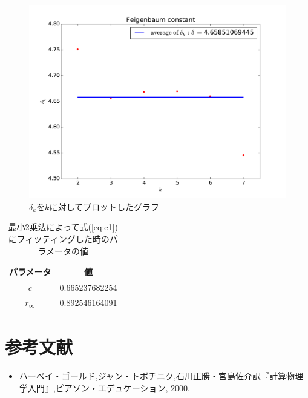 \documentclass{jsarticle}
\begin{document}
\begin{enumerate}
\begin{enumerate}
   \begin{figure}[H]
    \begin{center}
     \includegraphics[width=12.0cm]{figure_1.pdf}
     \caption{$\delta_{k}$を$k$に対してプロットしたグラフ}
     \label{fig:f1}
    \end{center}
   \end{figure}
   
   \begin{table}[htbp]
    \begin{center}
     \caption{最小2乗法によって式(\ref{eq:e1})にフィッティングした時のパラメータの値}
     \begin{tabular}{cc}
      パラメータ & 値  \\ \hline
	$c$ & 0.665237682254 \\
	$r_{\infty}$ & 0.892546164091 \\
	\hline
     \end{tabular}
     \label{tab:t2}
    \end{center}
   \end{table}
   
  \end{enumerate}
\end{enumerate}

\section{参考文献}
\begin{itemize}
 \item ハーベイ・ゴールド,ジャン・トボチニク,石川正勝・宮島佐介訳『計算物理学入門』,ピアソン・エデュケーション, 2000.
\end{itemize}
\end{document}
